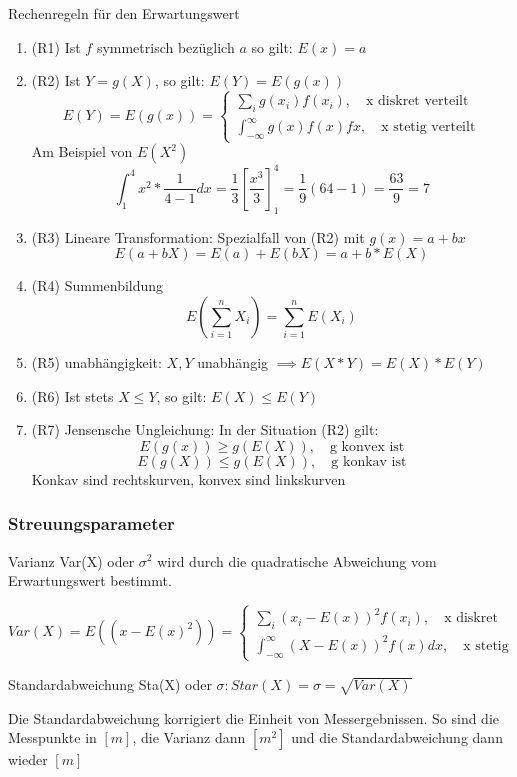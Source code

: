 \documentclass[a4paper]{article}
\begin{document}
Rechenregeln für den Erwartungswert

\begin{enumerate}
    \item (R1) Ist $f$ symmetrisch bezüglich $a$ so gilt: $E(x) = a$
    \item (R2) Ist $Y = g(X)$, so gilt: $E(Y)=E(g(x))$
    \[
    E(Y) = E(g(x)) = \begin{cases}
        \sum_{i} g(x_i)f(x_i), \quad \text{x diskret verteilt}\\
        \int_{-\infty}^{\infty} g(x) f(x)fx, \quad \text{x stetig verteilt}
    \end{cases}
    \]
    Am Beispiel von $E(X^2)$
    \[
    \int_{1}^{4}x^2 * \frac{1}{4-1} dx = \frac{1}{3} [\frac{x^3}{3}]_1^4=\frac{1}{9}(64-1) = \frac{63}{9} = 7
    \]
    \item (R3) Lineare Transformation: Spezialfall von (R2) mit $ g(x) = a + bx$
    \[
    E(a+bX) = E(a) + E(bX) = a + b*E(X)
    \]
    \item (R4) Summenbildung
    \[
    E(\sum_{i=1}^n X_i) = \sum_{i=1}^{n}E(X_i)
    \]
    \item (R5) unabhängigkeit: $X, Y$ unabhängig $\implies E(X*Y) = E(X) * E(Y)$
    \item (R6) Ist stets $X\leq Y$, so gilt: $E(X) \leq E(Y)$
    \item (R7) Jensensche Ungleichung: In der Situation (R2) gilt:
    \[
    E(g(x)) \geq g(E(X)), \quad \text{g konvex ist}
    \]
    \[
    E(g(X)) \leq g(E(X)), \quad \text{g konkav ist}
    \]
    Konkav sind rechtskurven, konvex sind linkskurven
\end{enumerate}

\subsubsection{Streuungsparameter}

Varianz Var(X) oder $\sigma^2$ wird durch die quadratische Abweichung vom Erwartungswert bestimmt.

\[
Var(X) = E((x-E(x)^2)) = \begin{cases}
    \sum_{i} (x_i-E(x))^2 f(x_i), \quad \text{x diskret}\\
    \int_{-\infty}^{\infty} (X-E(x))^2 f(x)dx, \quad \text{x stetig}
\end{cases}
\]

Standardabweichung Sta(X) oder $\sigma:Star(X)=\sigma=\sqrt{Var(X)}$

Die Standardabweichung korrigiert die Einheit von Messergebnissen. So sind die Messpunkte in $[m]$, die Varianz dann $[m^2]$ und die Standardabweichung dann wieder $[m]$
\end{document}
